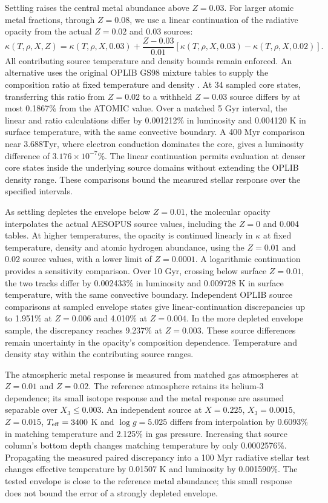 \documentclass[11pt,letterpaper]{article}
\newcommand{\Tyr}{\mathrm{Tyr}}
\begin{document}
Settling raises the central metal abundance above $Z=0.03$. For larger
atomic metal fractions, through $Z=0.08$, we use a linear continuation of
the radiative opacity from the actual $Z=0.02$ and 0.03 sources:
\begin{equation}
 \kappa(T,\rho,X,Z)=\kappa(T,\rho,X,0.03)
 +\frac{Z-0.03}{0.01}
 [\kappa(T,\rho,X,0.03)-\kappa(T,\rho,X,0.02)].
\end{equation}
All contributing source temperature and density bounds remain enforced.
An alternative uses the original OPLIB GS98 mixture tables to supply the
composition ratio at fixed temperature and density \cite{colgan16,farag24}.
At 34 sampled core states, transferring this ratio from $Z=0.02$ to a
withheld $Z=0.03$ source differs by at most 0.1867\% from the ATOMIC value.
Over a matched 5 Gyr interval, the linear and ratio calculations differ by
0.001212\% in luminosity and 0.004120 K in surface temperature, with the
same convective boundary. A 400 Myr comparison near $3.688\Tyr$, where
electron conduction dominates the core, gives a luminosity difference of
$3.176\times10^{-7}\%$. The linear continuation permits evaluation at
denser core states inside the underlying source domains without extending
the OPLIB density range. These comparisons bound the measured stellar
response over the specified intervals.


As settling depletes the envelope below $Z=0.01$, the molecular opacity
interpolates the actual AESOPUS source values, including the $Z=0$ and
0.004 tables. At higher temperatures, the opacity is continued linearly in
$\kappa$ at fixed temperature, density and atomic hydrogen abundance, using
the $Z=0.01$ and 0.02 source values, with a lower limit of $Z=0.0001$.
A logarithmic continuation provides a sensitivity comparison. Over 10 Gyr,
crossing below surface $Z=0.01$, the two tracks differ by 0.002433\% in
luminosity and 0.009728 K in surface temperature, with the same convective
boundary. Independent OPLIB source comparisons at sampled envelope states
give linear-continuation discrepancies up to 1.951\% at $Z=0.006$ and
4.010\% at $Z=0.004$. In the more depleted envelope sample, the discrepancy
reaches 9.237\% at $Z=0.003$. These source differences remain uncertainty
in the opacity's composition dependence. Temperature and density stay
within the contributing source ranges.

The atmospheric metal response is measured from matched gas atmospheres at
$Z=0.01$ and $Z=0.02$. The reference atmosphere retains its helium-3
dependence; its small isotope response and the metal response are assumed
separable over $X_3\leq0.003$. An independent source at $X=0.225$,
$X_3=0.0015$, $Z=0.015$, $T_{\rm eff}=3400$ K and $\log g=5.025$
differs from interpolation by 0.6093\% in matching temperature and 2.125\%
in gas pressure. Increasing that source column's bottom depth changes
matching temperature by only 0.0002576\%. Propagating the measured paired
discrepancy into a 100 Myr radiative stellar test changes effective temperature
by 0.01507 K and luminosity by 0.001590\%. The tested envelope is close to
the reference metal abundance; this small response does not bound the error
of a strongly depleted envelope.
\end{document}
